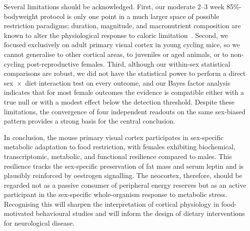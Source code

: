 \documentclass[11pt]{article}
\begin{document}
Several limitations should be acknowledged. First, our moderate 2--3 week 85\%-bodyweight protocol is only one point in a much larger space of possible restriction paradigms; duration, magnitude, and macronutrient composition are known to alter the physiological response to caloric limitation~\citep{lopezdominguez2016omega3, greenfield2025lifespan, ryu2023timerestricted}. Second, we focused exclusively on adult primary visual cortex in young cycling mice, so we cannot generalise to other cortical areas, to juveniles or aged animals, or to non-cycling post-reproductive females. Third, although our within-sex statistical comparisons are robust, we did not have the statistical power to perform a direct sex~$\times$~diet interaction test on every outcome, and our Bayes factor analysis indicates that for most female outcomes the evidence is compatible either with a true null or with a modest effect below the detection threshold. Despite these limitations, the convergence of four independent readouts on the same sex-biased pattern provides a strong basis for the central conclusion.

In conclusion, the mouse primary visual cortex participates in sex-specific metabolic adaptation to food restriction, with females exhibiting biochemical, transcriptomic, metabolic, and functional resilience compared to males. This resilience tracks the sex-specific preservation of fat mass and serum leptin and is plausibly reinforced by oestrogen signalling. The neocortex, therefore, should be regarded not as a passive consumer of peripheral energy reserves but as an active participant in the sex-specific whole-organism response to metabolic stress. Recognising this will sharpen the interpretation of cortical physiology in food-motivated behavioural studies and will inform the design of dietary interventions for neurological disease.


\end{document}
